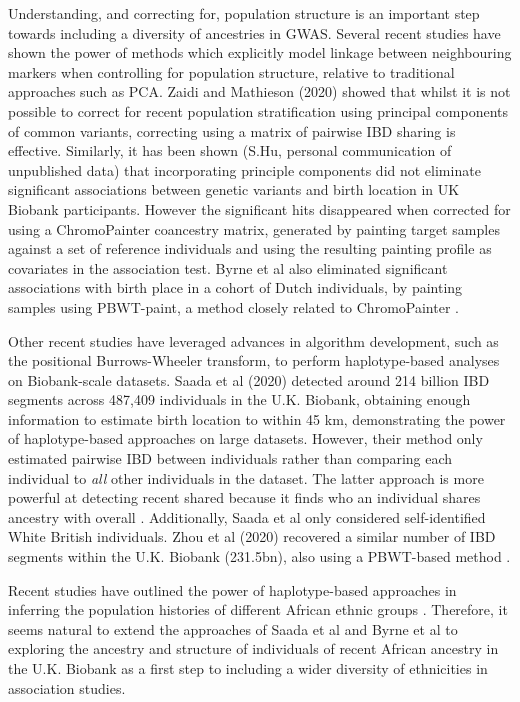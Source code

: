 Understanding, and correcting for, population structure is an important step towards including a diversity of ancestries in GWAS. Several recent studies have shown the power of methods which explicitly model linkage between neighbouring markers when controlling for population structure, relative to traditional approaches such as PCA. Zaidi and Mathieson (2020) \cite{zaidi2020demographic} showed that whilst it is not possible to correct for recent population stratification using principal components of common variants, correcting using a matrix of pairwise IBD sharing is effective. Similarly, it has been shown (S.Hu, personal communication of unpublished data) that incorporating principle components did not eliminate significant associations between genetic variants and birth location in UK Biobank participants. However the significant hits disappeared when corrected for using a ChromoPainter coancestry matrix, generated by painting target samples against a set of reference individuals and using the resulting painting profile as covariates in the association test. Byrne et al also eliminated significant associations with birth place in a cohort of Dutch individuals, by painting samples using PBWT-paint, a method closely related to ChromoPainter \cite{byrne2020dutch}. 

Other recent studies have leveraged advances in algorithm development, such as the positional Burrows-Wheeler transform, to perform haplotype-based analyses on Biobank-scale datasets. Saada et al (2020) detected around 214 billion IBD segments across 487,409 individuals in the U.K. Biobank, obtaining enough information to estimate birth location to within 45 km, demonstrating the power of haplotype-based approaches on large datasets. However, their method only estimated pairwise IBD between individuals rather than comparing each individual to \textit{all} other individuals in the dataset. The latter approach is more powerful at detecting recent shared because it finds who an individual shares ancestry with overall \cite{LawsonFalushReview}. Additionally, Saada et al only considered self-identified White British individuals. Zhou et al (2020) recovered a similar number of IBD segments within the U.K. Biobank (231.5bn), also using a PBWT-based method \cite{ZHOU2020426}.


Recent studies have outlined the power of haplotype-based approaches in inferring the population histories of different African ethnic groups \cite{lopez2021evidence, StructureEthiopians2021, gurdasani2019uganda}. Therefore, it seems natural to extend the approaches of Saada et al and Byrne et al to exploring the ancestry and structure of individuals of recent African ancestry in the U.K. Biobank as a first step to including a wider diversity of ethnicities in association studies. 

